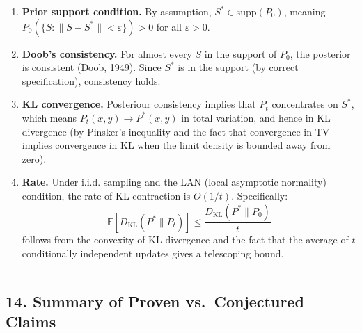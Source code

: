 \documentclass[
  12pt,
]{article}
\begin{document}
\begin{enumerate}
\def\labelenumi{\arabic{enumi}.}
\item
  \textbf{Prior support condition.} By assumption,
  \(S^* \in \text{supp}(P_0)\), meaning
  \(P_0(\{S: \|S - S^*\| < \varepsilon\}) > 0\) for all
  \(\varepsilon > 0\).
\item
  \textbf{Doob's consistency.} For almost every \(S\) in the support of
  \(P_0\), the posterior is consistent (Doob, 1949). Since \(S^*\) is in
  the support (by correct specification), consistency holds.
\item
  \textbf{KL convergence.} Posteriour consistency implies that \(P_t\)
  concentrates on \(S^*\), which means \(P_t(x,y) \to P^*(x,y)\) in
  total variation, and hence in KL divergence (by Pinsker's inequality
  and the fact that convergence in TV implies convergence in KL when the
  limit density is bounded away from zero).
\item
  \textbf{Rate.} Under i.i.d. sampling and the LAN (local asymptotic
  normality) condition, the rate of KL contraction is \(O(1/t)\).
  Specifically: \[
  \mathbb{E}[D_{\text{KL}}(P^* \parallel P_t)] \leq \frac{D_{\text{KL}}(P^* \parallel P_0)}{t}
  \] follows from the convexity of KL divergence and the fact that the
  average of \(t\) conditionally independent updates gives a telescoping
  bound.
\end{enumerate}

\begin{center}\rule{0.5\linewidth}{0.5pt}\end{center}

\subsection{14. Summary of Proven vs.~Conjectured
Claims}\label{summary-of-proven-vs.-conjectured-claims}
\end{document}
